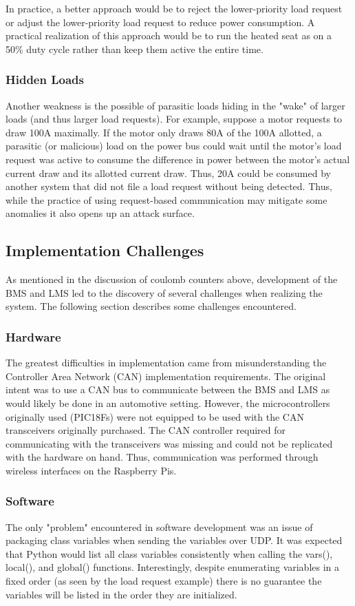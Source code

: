 \documentclass[11pt,conference,draftcls,onecolumn]{IEEEtran}
\begin{document}
In practice, a better approach would be to reject the lower-priority load request or adjust the lower-priority load request to reduce power consumption.
A practical realization of this approach would be to run the heated seat as on a 50\% duty cycle rather than keep them active the entire time.

\subsubsection{Hidden Loads}
Another weakness is the possible of parasitic loads hiding in the "wake" of larger loads (and thus larger load requests).
For example, suppose a motor requests to draw 100A maximally.
If the motor only draws 80A of the 100A allotted, a parasitic (or malicious) load on the power bus could wait until the motor's load request was active to consume the difference in power between the motor's actual current draw and its allotted current draw.
Thus, 20A could be consumed by another system that did not file a load request without being detected.
Thus, while the practice of using request-based communication may mitigate some anomalies it also opens up an attack surface.

\subsection{Implementation Challenges}
As mentioned in the discussion of coulomb counters above, development of the BMS and LMS led to the discovery of several challenges when realizing the system.
The following section describes some challenges encountered.

\subsubsection{Hardware}
The greatest difficulties in implementation came from misunderstanding the Controller Area Network (CAN) implementation requirements.
The original intent was to use a CAN bus to communicate between the BMS and LMS as would likely be done in an automotive setting.
However, the microcontrollers originally used (PIC18Fs) were not equipped to be used with the CAN transceivers originally purchased.
The CAN controller required for communicating with the transceivers was missing and could not be replicated with the hardware on hand.
Thus, communication was performed through wireless interfaces on the Raspberry Pis.

\subsubsection{Software}
The only "problem" encountered in software development was an issue of packaging class variables when sending the variables over UDP.
It was expected that Python would list all class variables consistently when calling the vars(), local(), and global() functions.
Interestingly, despite enumerating variables in a fixed order (as seen by the load request example) there is no guarantee the variables will be listed in the order they are initialized.
\end{document}
